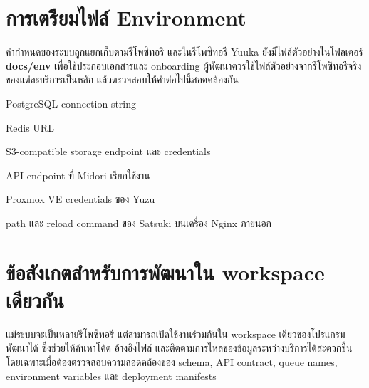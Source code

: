 \section{การเตรียมไฟล์ Environment}
\hspace*{1.3em}
ค่ากำหนดของระบบถูกแยกเก็บตามรีโพซิทอรี และในรีโพซิทอรี Yuuka ยังมีไฟล์ตัวอย่างในโฟลเดอร์ \textbf{docs/env} เพื่อใช้ประกอบเอกสารและ onboarding ผู้พัฒนาควรใช้ไฟล์ตัวอย่างจากรีโพซิทอรีจริงของแต่ละบริการเป็นหลัก แล้วตรวจสอบให้ค่าต่อไปนี้สอดคล้องกัน

\begin{mycustomenum2}
    \item PostgreSQL connection string
    \item Redis URL
    \item S3-compatible storage endpoint และ credentials
    \item API endpoint ที่ Midori เรียกใช้งาน
    \item Proxmox VE credentials ของ Yuzu
    \item path และ reload command ของ Satsuki บนเครื่อง Nginx ภายนอก
\end{mycustomenum2}

\section{ข้อสังเกตสำหรับการพัฒนาใน workspace เดียวกัน}
\hspace*{1.3em}
แม้ระบบจะเป็นหลายรีโพซิทอรี แต่สามารถเปิดใช้งานร่วมกันใน workspace เดียวของโปรแกรมพัฒนาได้ ซึ่งช่วยให้ค้นหาโค้ด อ้างอิงไฟล์ และติดตามการไหลของข้อมูลระหว่างบริการได้สะดวกขึ้น โดยเฉพาะเมื่อต้องตรวจสอบความสอดคล้องของ schema, API contract, queue names, environment variables และ deployment manifests
